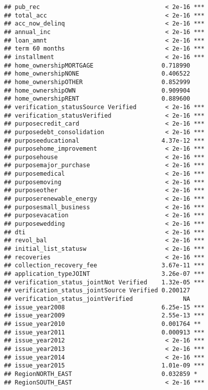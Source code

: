 \documentclass[]{article}
\begin{document}
\begin{verbatim}
## pub_rec                                   < 2e-16 ***
## total_acc                                 < 2e-16 ***
## acc_now_delinq                            < 2e-16 ***
## annual_inc                                < 2e-16 ***
## loan_amnt                                 < 2e-16 ***
## term 60 months                            < 2e-16 ***
## installment                               < 2e-16 ***
## home_ownershipMORTGAGE                   0.718990    
## home_ownershipNONE                       0.406522    
## home_ownershipOTHER                      0.852999    
## home_ownershipOWN                        0.909904    
## home_ownershipRENT                       0.889600    
## verification_statusSource Verified        < 2e-16 ***
## verification_statusVerified               < 2e-16 ***
## purposecredit_card                        < 2e-16 ***
## purposedebt_consolidation                 < 2e-16 ***
## purposeeducational                       4.37e-12 ***
## purposehome_improvement                   < 2e-16 ***
## purposehouse                              < 2e-16 ***
## purposemajor_purchase                     < 2e-16 ***
## purposemedical                            < 2e-16 ***
## purposemoving                             < 2e-16 ***
## purposeother                              < 2e-16 ***
## purposerenewable_energy                   < 2e-16 ***
## purposesmall_business                     < 2e-16 ***
## purposevacation                           < 2e-16 ***
## purposewedding                            < 2e-16 ***
## dti                                       < 2e-16 ***
## revol_bal                                 < 2e-16 ***
## initial_list_statusw                      < 2e-16 ***
## recoveries                                < 2e-16 ***
## collection_recovery_fee                  3.67e-11 ***
## application_typeJOINT                    3.26e-07 ***
## verification_status_jointNot Verified    1.32e-05 ***
## verification_status_jointSource Verified 0.200127    
## verification_status_jointVerified              NA    
## issue_year2008                           6.25e-15 ***
## issue_year2009                           2.55e-13 ***
## issue_year2010                           0.001764 ** 
## issue_year2011                           0.000913 ***
## issue_year2012                            < 2e-16 ***
## issue_year2013                            < 2e-16 ***
## issue_year2014                            < 2e-16 ***
## issue_year2015                           1.01e-09 ***
## RegionNORTH_EAST                         0.032859 *  
## RegionSOUTH_EAST                          < 2e-16 ***

\end{verbatim}
\end{document}
